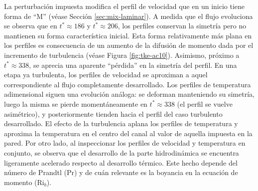 La perturbación impuesta modifica el perfil de velocidad que en un inicio tiene forma de ``M'' (véase Sección \ref{sec:mix-laminar}). A medida que el flujo evoluciona se observa que en $t^* \approx 186$ y $t^* \approx 206$, los perfiles conservan la simetría pero no mantienen su forma característica inicial. Esta forma relativamente más plana en los perfiles es consecuencia de un aumento de la difusión de momento dada por el incremento de turbulencia (véase Figura \ref{fig:tke-ac10}). Asimismo, próximo a $t^* \approx 338$, se aprecia una aparente ``pérdida'' en la simetría del perfil. En una etapa ya turbulenta, los perfiles de velocidad se aproximan a aquel correspondiente al flujo completamente desarrollado. Los perfiles de temperatura adimensional siguen una evolución análoga: se deforman manteniendo su simetría, luego la misma se pierde momentáneamente en $t^* \approx 338$ (el perfil se vuelve asimétrico), y posteriormente tienden hacia el perfil del caso turbulento desarrollado. El efecto de la turbulencia aplana los perfiles de temperatura y aproxima la temperatura en el centro del canal al valor de aquella impuesta en la pared. Por otro lado, al inspeccionar los perfiles de velocidad y temperatura en conjunto, se observa que el desarrollo de la parte hidrodinámica se encuentra ligeramente acelerado respecto al desarrollo térmico. Este hecho depende del número de Prandtl (Pr) y de cuán relevante es la boyancia en la ecuación de momento (Ri$_b$).





